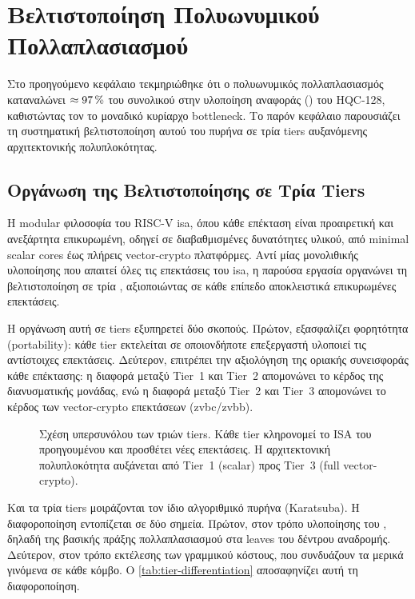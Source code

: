 \chapter{Βελτιστοποίηση Πολυωνυμικού Πολλαπλασιασμού}
\label{ch:polymul-optimization}

Στο προηγούμενο κεφάλαιο τεκμηριώθηκε ότι ο πολυωνυμικός πολλαπλασιασμός
καταναλώνει $\approx\SI{97}{\percent}$ του συνολικού \instret στην υλοποίηση
αναφοράς () του HQC-128, καθιστώντας τον το μοναδικό κυρίαρχο bottleneck. Το παρόν κεφάλαιο
παρουσιάζει τη συστηματική βελτιστοποίηση αυτού του πυρήνα σε τρία tiers αυξανόμενης αρχιτεκτονικής πολυπλοκότητας.

\section{Οργάνωση της Βελτιστοποίησης σε Τρία Tiers}
\label{sec:polymul-tiers}

Η modular φιλοσοφία του RISC-V \gls{isa}, όπου κάθε επέκταση είναι προαιρετική
και ανεξάρτητα επικυρωμένη, οδηγεί σε διαβαθμισμένες δυνατότητες υλικού, από
minimal scalar cores έως πλήρεις vector-crypto πλατφόρμες. Αντί μίας
μονολιθικής υλοποίησης που απαιτεί όλες τις επεκτάσεις του \gls{isa}, η παρούσα
εργασία οργανώνει τη βελτιστοποίηση σε τρία , αξιοποιώντας σε
κάθε επίπεδο αποκλειστικά επικυρωμένες επεκτάσεις.

Η οργάνωση αυτή σε tiers εξυπηρετεί δύο σκοπούς. Πρώτον, εξασφαλίζει
φορητότητα (portability): κάθε tier εκτελείται σε οποιονδήποτε επεξεργαστή
υλοποιεί τις αντίστοιχες επεκτάσεις.
Δεύτερον, επιτρέπει την αξιολόγηση της οριακής συνεισφοράς κάθε επέκτασης:
η διαφορά μεταξύ Tier~1 και Tier~2 απομονώνει το κέρδος της διανυσματικής
μονάδας, ενώ η διαφορά μεταξύ Tier~2 και Tier~3 απομονώνει το κέρδος των
vector-crypto επεκτάσεων (\gls{zvbc}/\gls{zvbb}).

\begin{figure}[htbp]
  \centering
  
  \caption[Ιεραρχία ISA tiers]{Σχέση υπερσυνόλου των τριών tiers. Κάθε tier κληρονομεί το ISA του προηγουμένου και προσθέτει νέες επεκτάσεις. Η αρχιτεκτονική πολυπλοκότητα αυξάνεται από Tier~1 (scalar) προς Tier~3 (full vector-crypto).}
  \label{fig:polymul-tiers}
\end{figure}

Και τα τρία tiers μοιράζονται τον ίδιο αλγοριθμικό πυρήνα (Karatsuba).
Η διαφοροποίηση εντοπίζεται σε δύο σημεία. Πρώτον, στον τρόπο υλοποίησης του
, δηλαδή της βασικής πράξης πολλαπλασιασμού στα leaves του
δέντρου αναδρομής. Δεύτερον, στον τρόπο εκτέλεσης των  γραμμικού κόστους, που συνδυάζουν τα μερικά γινόμενα σε κάθε
κόμβο. Ο \cref{tab:tier-differentiation} αποσαφηνίζει αυτή τη διαφοροποίηση.

